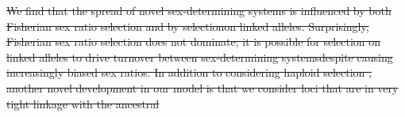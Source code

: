 \documentclass[10pt,letterpaper]{article}
\providecommand{\DIFdeltex}[1]{{\protect\color{red}\sout{#1}}}                      %
\providecommand{\DIFdelbegin}{} %
\providecommand{\DIFdelend}{} %
\providecommand{\DIFdel}[1]{\texorpdfstring{\DIFdeltex{#1}}{}} %
\newcommand{\DIFscaledelfig}{0.5}
\newlength{\DIFdelgraphicswidth} %
\newlength{\DIFdelgraphicsheight} %
\newcommand{\DIFdelincludegraphics}[2][]{%
\sbox{\DIFdelgraphicsbox}{\DIFOincludegraphics[#1]{#2}}%
\settoboxwidth{\DIFdelgraphicswidth}{\DIFdelgraphicsbox} %
\settoboxtotalheight{\DIFdelgraphicsheight}{\DIFdelgraphicsbox} %
\scalebox{\DIFscaledelfig}{%
\parbox[b]{\DIFdelgraphicswidth}{\usebox{\DIFdelgraphicsbox}\\[-\baselineskip] \rule{\DIFdelgraphicswidth}{0em}}\llap{\resizebox{\DIFdelgraphicswidth}{\DIFdelgraphicsheight}{%
\setlength{\unitlength}{\DIFdelgraphicswidth}%
\begin{picture}(1,1)%
\thicklines\linethickness{2pt} %
{\color[rgb]{1,0,0}\put(0,0){\framebox(1,1){}}}%
{\color[rgb]{1,0,0}\put(0,0){\line( 1,1){1}}}%
{\color[rgb]{1,0,0}\put(0,1){\line(1,-1){1}}}%
\end{picture}%
}\hspace*{3pt}}} %
} %
\DeclareRobustCommand{\DIFdelbegin}{\DIFOdelbegin \let\includegraphics\DIFdelincludegraphics} %
\DeclareRobustCommand{\DIFdelend}{\DIFOaddend \let\includegraphics\DIFOincludegraphics} %
\begin{document}
\DIFdelbegin \DIFdel{We find that the spread of novel sex-determining systems is influenced by both Fisherian sex ratio selection and by selectionon linked alleles. 
Surprisingly, Fisherian sex ratio selection does not dominate; it is possible for selection on linked alleles to drive turnover between sex-determining systemsdespite causing increasingly biased sex ratios. 
In addition to considering haploid selection , another novel development in our model is that we consider loci that are in very tight linkage with the ancestral }\DIFdelend %
\end{document}
